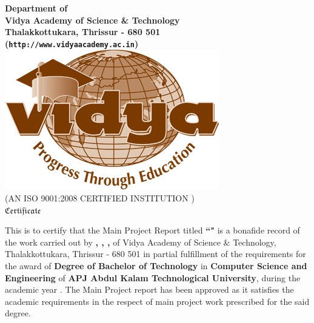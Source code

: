 



\begin{titlepage}


\begin{center}


{\Large \bf Department of \vdept  }\\
{\Large \bf Vidya Academy of Science \& Technology}\\
{\normalsize \bf Thalakkottukara, Thrissur - 680 501\\
({\tt http://www.vidyaacademy.ac.in})}\\[0.75cm]
%
%
\includegraphics[width=3.5 cm]{VidyaLogo.JPG}\\
\scriptsize (AN ISO 9001:2008 CERTIFIED INSTITUTION )\\[.3 cm]
%
 \Huge  $ \mathfrak{Certificate}$\\[0.3cm]
%
\end{center}

\quad This is to certify that the Main Project Report titled {\bf ``\vtitle"} is a bonafide record of the work carried out by {\bf \vauthora ,   \vauthorb ,  \vauthorc ,  \vauthord} of Vidya Academy of Science \& Technology, Thalakkottukara, Thrissur - 680 501 in partial fulfillment of the requirements for the award of  {\bf Degree of Bachelor of Technology} in {\bf Computer Science and Engineering} of  {\bf APJ Abdul Kalam Technological University}, during the academic year \vacademicyear. The Main Project report has been approved as it satisfies the academic requirements in the respect of main project work prescribed for the said degree.\\[.2cm]
 

\end{titlepage}
